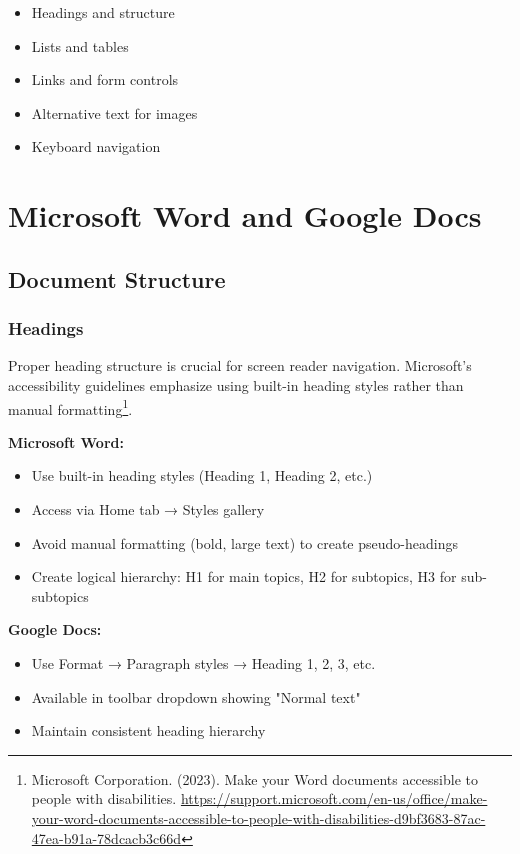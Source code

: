 \begin{itemize}
\item Headings and structure
\item Lists and tables
\item Links and form controls
\item Alternative text for images
\item Keyboard navigation
\end{itemize}

\section{Microsoft Word and Google Docs}

\subsection{Document Structure}

\subsubsection{Headings}
Proper heading structure is crucial for screen reader navigation. Microsoft's accessibility guidelines emphasize using built-in heading styles rather than manual formatting\footnote{Microsoft Corporation. (2023). Make your Word documents accessible to people with disabilities. \url{https://support.microsoft.com/en-us/office/make-your-word-documents-accessible-to-people-with-disabilities-d9bf3683-87ac-47ea-b91a-78dcacb3c66d}}.

\textbf{Microsoft Word:}
\begin{itemize}
\item Use built-in heading styles (Heading 1, Heading 2, etc.)
\item Access via Home tab → Styles gallery
\item Avoid manual formatting (bold, large text) to create pseudo-headings
\item Create logical hierarchy: H1 for main topics, H2 for subtopics, H3 for sub-subtopics
\end{itemize}

\textbf{Google Docs:}
\begin{itemize}
\item Use Format → Paragraph styles → Heading 1, 2, 3, etc.
\item Available in toolbar dropdown showing "Normal text"
\item Maintain consistent heading hierarchy
\end{itemize}

